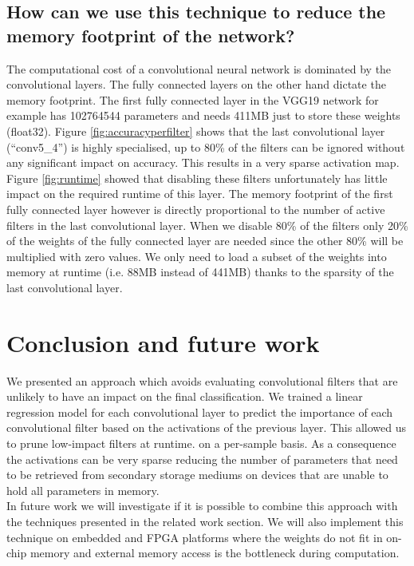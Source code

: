 \documentclass{article}
\begin{document}
\subsection{How can we use this technique to reduce the memory footprint of the network?}
\label{section_memory}
The computational cost of a convolutional neural network is dominated by the convolutional layers. The fully connected layers on the other hand dictate the memory footprint. The first fully connected layer in the VGG19 network for example has 102764544 parameters and needs 411MB just to store these weights (float32). Figure \ref{fig:accuracyperfilter} shows that the last convolutional layer (``conv5\_4'') is highly specialised, up to 80\% of the filters can be ignored without any significant impact on accuracy. This results in a very sparse activation map. Figure \ref{fig:runtime} showed that disabling these filters unfortunately has little impact on the required runtime of this layer. The memory footprint of the first fully connected layer however is directly proportional to the number of active filters in the last convolutional layer. When we disable 80\% of the filters only 20\% of the weights of the fully connected layer are needed since the other 80\% will be multiplied with zero values. We only need to load a subset of the weights into memory at runtime (i.e. 88MB instead of 441MB) thanks to the sparsity of the last convolutional layer.



\section{Conclusion and future work}
\label{conclusion and future work}
We presented an approach which avoids evaluating convolutional filters that are unlikely to have an impact on the final classification. We trained a linear regression model for each convolutional layer to predict the importance of each convolutional filter based on the activations of the previous layer. This allowed us to prune low-impact filters at runtime. on a per-sample basis. As a consequence the activations can be very sparse reducing the number of parameters that need to be retrieved from secondary storage mediums on devices that are unable to hold all parameters in memory.
\\
\newline
In future work we will investigate if it is possible to combine this approach with the techniques presented in the related work section. We will also implement this technique on embedded and FPGA platforms where the weights do not fit in on-chip memory and external memory access is the bottleneck  during computation.
\end{document}
